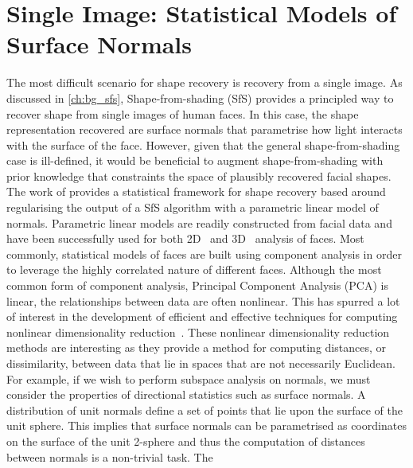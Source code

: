 \chapter{Single Image: Statistical Models of Surface Normals}\label{ch:singl_imag}
\minitoc{}
The most difficult scenario for shape recovery is recovery from a single
image. As discussed in \cref{ch:bg_sfs}, Shape-from-shading (SfS) provides a
principled way to recover shape from single images of human faces. In this case,
the shape representation recovered are surface normals that parametrise how
light interacts with the surface of the face. However, given that the general
shape-from-shading case is ill-defined, it would be beneficial to augment
shape-from-shading with prior knowledge that constraints the space of plausibly
recovered facial shapes. The work of \citet{smith2006recovering,smith2008facial}
provides a statistical framework for shape recovery based around regularising
the output of a SfS algorithm with a parametric linear model of normals.
Parametric linear models are readily constructed from facial data and have
been successfully used for both 2D~\cite{cootes2001active,turk1991eigenfaces}
and 3D~\cite{enciso1999synthesis,atick1996statistical} analysis of faces.
Most commonly, statistical models of faces are built using component analysis
in order to leverage the highly correlated nature of different faces. Although
the most common form of component analysis, Principal Component Analysis (PCA)
is linear, the relationships between data are often nonlinear.
This has spurred a lot of interest in the development of
efficient and effective techniques for computing nonlinear dimensionality
reduction~\cite{yang2005kpca,goudelis2007class,scholkopf1998nonlinear}. These
nonlinear dimensionality reduction methods are interesting as they provide
a method for computing distances, or dissimilarity, between data that
lie in spaces that are not necessarily Euclidean. For example, if we wish to
perform subspace analysis on normals, we must consider the properties of
directional statistics such as surface normals.
A distribution of unit normals define a set of points that lie upon the
surface of the unit sphere. This implies that surface normals can be
parametrised as coordinates on the surface of the unit 2-sphere and thus
the computation of distances between normals is a non-trivial task. The
